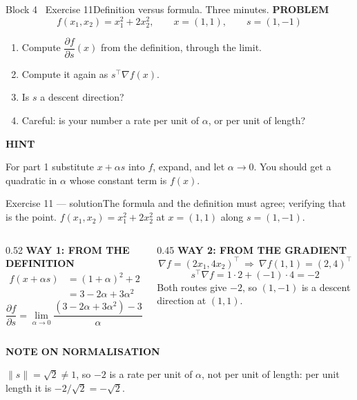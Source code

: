 \documentclass[aspectratio=169,11pt]{beamer}
\newcommand{\kicker}[1]{{\color{hseaccent}\scriptsize\bfseries\MakeUppercase{#1}}}
\newcommand{\takeaway}[2]{%
  \par\smallskip\noindent
  \colorbox{hselight}{\parbox{\dimexpr\textwidth-2\fboxsep}{%
    \kicker{#1}\par\vspace{0.12em}\footnotesize #2}}\par}
\begin{document}
\begin{frame}{Block 4 \textperiodcentered\ Exercise 11}{Definition versus formula. Three minutes.}
  \vspace{0.6em}
  \kicker{problem}
  \[ f(x_1,x_2)=x_1^{2}+2x_2^{2},\qquad x=(1,1),\qquad s=(1,-1) \]
  \vspace{-0.5em}
  \begin{enumerate}\small
    \item Compute $\dfrac{\partial f}{\partial s}(x)$ from the definition, through the limit.
    \item Compute it again as $s^{\top}\nabla f(x)$.
    \item Is $s$ a descent direction?
    \item Careful: is your number a rate per unit of $\alpha$, or per unit of length?
  \end{enumerate}
  \vspace{0.5em}
  \takeaway{hint}{For part 1 substitute $x+\alpha s$ into $f$, expand, and let $\alpha\to0$. You should get a
    quadratic in $\alpha$ whose constant term is $f(x)$.}
\end{frame}

\begin{frame}{Exercise 11 --- solution}{The formula and the definition must agree; verifying that is the point.}
  $f(x_1,x_2)=x_1^{2}+2x_2^{2}$ at $x=(1,1)$ along $s=(1,-1)$.
  \par\medskip
  \begin{columns}[T,onlytextwidth]
    \begin{column}{0.52\textwidth}
      \kicker{way 1: from the definition}
      \begin{align*}
        f(x+\alpha s) & =(1+\alpha)^2+2(1-\alpha)^2 \\
                      & =3-2\alpha+3\alpha^{2}
      \end{align*}
      \[ \frac{\partial f}{\partial s}=\lim_{\alpha\to0}\frac{(3-2\alpha+3\alpha^{2})-3}{\alpha}=-2 \]
    \end{column}
    \begin{column}{0.45\textwidth}
      \kicker{way 2: from the gradient}
      \[ \nabla f=(2x_1,4x_2)^{\top}\ \Rightarrow\ \nabla f(1,1)=(2,4)^{\top} \]
      \[ s^{\top}\nabla f = 1\cdot 2+(-1)\cdot 4=-2 \]
      {\small Both routes give $-2$, so $(1,-1)$ is a descent direction at $(1,1)$.}
    \end{column}
  \end{columns}
  \par\medskip
  \takeaway{note on normalisation}{$\|s\|=\sqrt2\neq 1$, so $-2$ is a rate per unit of $\alpha$, not per unit
    of length: per unit length it is $-2/\sqrt2=-\sqrt2$.}
\end{frame}
\end{document}
